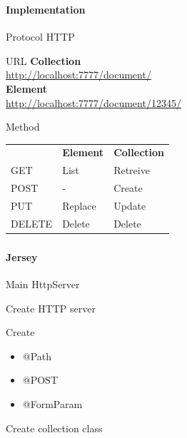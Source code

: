 \documentclass[handout]{beamer}
\begin{document}
\begin{frame}
	\frametitle{\insertsection}
	\framesubtitle{Implementation}
	\begin{block}{Protocol}
		HTTP
	\end{block}
	\begin{block}{URL}
		\textbf{Collection} \\
		\url{http://localhost:7777/document/} \\
		\textbf{Element} \\
		\url{http://localhost:7777/document/12345/}
	\end{block}
	\begin{block}{Method}
		\begin{tabular}{lll}
			& \textbf{Element} & \textbf{Collection} \\
			GET & List & Retreive \\
			POST & - & Create \\
			PUT & Replace & Update \\
			DELETE & Delete & Delete \\
		\end{tabular}
	\end{block}
\end{frame}

\begin{frame}
	\frametitle{\insertsection}
	\framesubtitle{Jersey}
	\begin{block}{Main}
		HttpServer
	\end{block}
	\begin{semiverbatim}
		Create HTTP server
	\end{semiverbatim}
	\begin{block}{Create}
		\begin{itemize}
			\item @Path
			\item @POST
			\item @FormParam
		\end{itemize}
	\end{block}
	\begin{semiverbatim}
		Create collection class
	\end{semiverbatim}
\end{frame}
\end{document}
